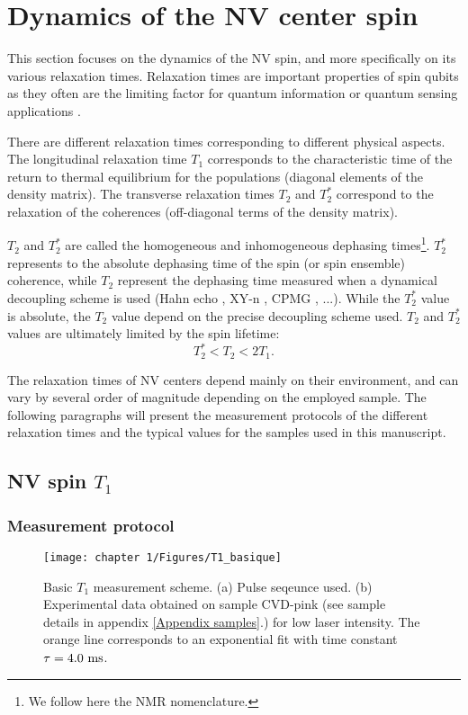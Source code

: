 \documentclass[a4paper, 11pt]{report}
\begin{document}
\section{Dynamics of the NV center spin}

This section focuses on the dynamics of the NV spin, and more specifically on its various relaxation times. Relaxation times are important properties of spin qubits as they often are the limiting factor for quantum information or quantum sensing applications \citep{de2021materials, degen2017quantum}.

There are different relaxation times corresponding to different physical aspects. The longitudinal relaxation time $T_1$ corresponds to the characteristic time of the return to thermal equilibrium for the populations (diagonal elements of the density matrix). The transverse relaxation times $T_2$ and $T_2^*$ correspond to the relaxation of the coherences  (off-diagonal terms of the density matrix).

$T_2$ and $T_2^*$ are called the homogeneous and inhomogeneous dephasing times\footnote{We follow here the NMR nomenclature.}. $T_2^*$ represents to the absolute dephasing time of the spin (or spin ensemble) coherence, while $T_2$ represent the dephasing time measured when a dynamical decoupling scheme is used (Hahn echo \citep{hahn1950spin}, XY-n \citep{maudsley1986modified}, CPMG \citep{carr1954effects} , ...). While the $T_2^*$ value is absolute, the $T_2$ value depend on the precise decoupling scheme used. $T_2$ and $T_2^*$ values are ultimately limited by the spin lifetime:
\begin{equation}
T_2^* < T_2 < 2 T_1.
\end{equation}

The relaxation times of NV centers depend mainly on their environment, and can vary by several order of magnitude depending on the employed sample. The following paragraphs will present the measurement protocols of the different relaxation times and the typical values for the samples used in this manuscript.

\subsection{NV spin $T_1$}
\label{sec T1 NV}
\subsubsection{Measurement protocol}
\begin{figure}[h!]
\centering
\texttt{[image: chapter 1/Figures/T1\_basique]}
\caption{Basic $T_1$ measurement scheme. (a) Pulse seqeunce used. (b) Experimental data obtained on sample CVD-pink (see sample details in appendix \ref{Appendix samples}.) for low laser intensity. The orange line corresponds to an exponential fit with time constant $\tau=4.0\ \rm ms$.}
\label{T1 basique}
\end{figure}
\end{document}
